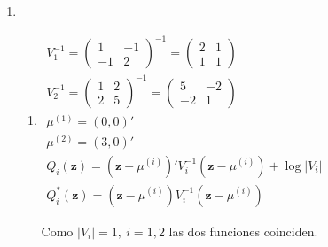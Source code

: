 \begin{enumerate}[label=\color{red}\textbf{\arabic*)}, leftmargin=*]
	\item {}
	\begin{enumerate}[label=\color{red}\alph*)]
		\item {}
		
		$\begin{array}{l}
		V_1^{-1}=\begin{pmatrix}
		1 & -1\\
		-1 & 2
		\end{pmatrix}^{-1}=\begin{pmatrix}
		2 & 1\\
		1 & 1
		\end{pmatrix}\\
		V_2^{-1}=\begin{pmatrix}
		1 & 2\\
		2 & 5
		\end{pmatrix}^{-1}=\begin{pmatrix}
		5 & -2\\
		-2 & 1
		\end{pmatrix}\\
		\mu^{(1)}=(0,0)'\\
		\mu^{(2)}=(3,0)'\\
		Q_i(\mathbf{z})=(\mathbf{z}-\mu^{(i)})'V_i^{-1}(\mathbf{z}-\mu^{(i)})+\log|V_i|\\
		Q_i^*(\mathbf{z})=(\mathbf{z}-\mu^{(i)})V_i^{-1}(\mathbf{z}-\mu^{(i)})
		\end{array}$
		
		Como $|V_i|=1,\:i=1,2$ las dos funciones coinciden.
		

\end{enumerate}
\end{enumerate}
